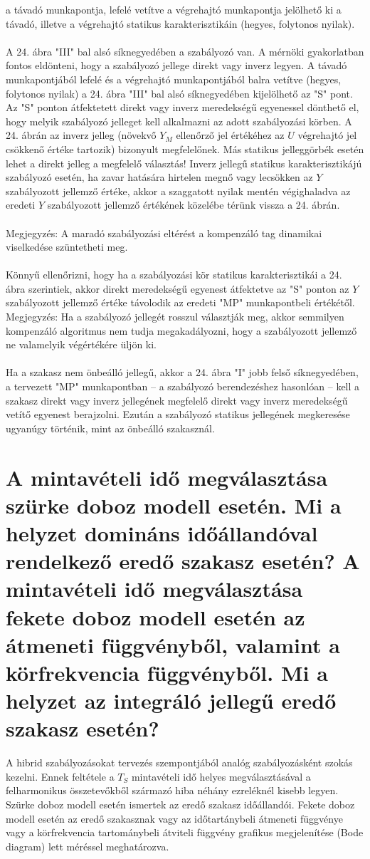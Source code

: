 \documentclass[11pt,a4paper]{article}
\begin{document}
a távadó munkapontja, lefelé vetítve a végrehajtó munkapontja jelölhető ki a távadó,
illetve a végrehajtó statikus karakterisztikáin (hegyes, folytonos nyilak).
\\\\
A 24. ábra "III" bal alsó síknegyedében a szabályozó van. A mérnöki gyakorlatban
fontos eldönteni, hogy a szabályozó jellege direkt vagy inverz legyen. A távadó
munkapontjából lefelé és a végrehajtó munkapontjából balra vetítve (hegyes, folytonos
nyilak) a 24. ábra "III" bal alsó síknegyedében kijelölhető az "S" pont.
Az "S" ponton átfektetett direkt vagy inverz meredekségű egyenessel dönthető
el, hogy melyik szabályozó jelleget kell alkalmazni az adott szabályozási körben. A
24. ábrán az inverz jelleg (növekvő $Y_M$ ellenőrző jel értékéhez az $U$ végrehajtó jel
csökkenő értéke tartozik) bizonyult megfelelőnek. Más statikus jelleggörbék esetén lehet
a direkt jelleg a megfelelő választás!
Inverz jellegű statikus karakterisztikájú szabályozó esetén, ha zavar hatására
hirtelen megnő vagy lecsökken az $Y$ szabályozott jellemző értéke, akkor a szaggatott
nyilak mentén végighaladva az eredeti $Y$ szabályozott jellemző értékének közelébe térünk
vissza a 24. ábrán.\\\\
Megjegyzés: A maradó szabályozási eltérést a kompenzáló tag dinamikai viselkedése
szüntetheti meg.\\\\
Könnyű ellenőrizni, hogy ha a szabályozási kör statikus karakterisztikái a 24.
ábra szerintiek, akkor direkt meredekségű egyenest átfektetve az "S" ponton az $Y$ szabályozott
jellemző értéke távolodik az eredeti "MP" munkapontbeli értékétől.
Megjegyzés: Ha a szabályozó jellegét rosszul választják meg, akkor semmilyen
kompenzáló algoritmus nem tudja megakadályozni, hogy a szabályozott jellemző ne
valamelyik végértékére üljön ki.\\\\
Ha a szakasz nem önbeálló jellegű, akkor a 24. ábra "I" jobb felső
síknegyedében, a tervezett "MP" munkapontban – a szabályozó berendezéshez hasonlóan
– kell a szakasz direkt vagy inverz jellegének megfelelő direkt vagy inverz
meredekségű vetítő egyenest berajzolni. Ezután a szabályozó statikus jellegének megkeresése
ugyanúgy történik, mint az önbeálló szakasznál.
\section{A mintavételi idő megválasztása szürke doboz modell esetén.  Mi a helyzet domináns időállandóval rendelkező eredő szakasz esetén? A mintavételi idő megválasztása fekete doboz modell esetén az átmeneti függvényből, valamint a körfrekvencia függvényből. Mi a helyzet az integráló jellegű eredő szakasz esetén?}
A hibrid szabályozásokat tervezés szempontjából analóg szabályozásként szokás
kezelni. Ennek feltétele a $T_S$ mintavételi idő helyes megválasztásával a felharmonikus összetevőkből származó hiba néhány ezreléknél kisebb legyen.
Szürke doboz modell esetén ismertek az eredő szakasz időállandói. Fekete doboz
modell esetén az eredő szakasznak vagy az időtartánybeli átmeneti függvénye
vagy a körfrekvencia tartománybeli átviteli függvény grafikus megjelenítése (Bode diagram) lett méréssel meghatározva.
\end{document}

